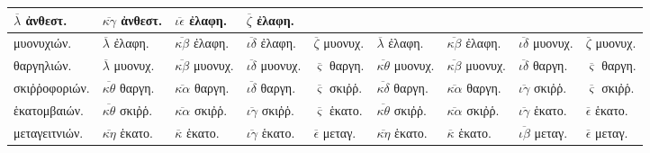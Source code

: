 \begin{tabular}{l llllllll}
$\overline{\lambda}$         \textgreek{ἀνθεστ.} &
$\overline{\kappa\gamma}$    \textgreek{ἀνθεστ.} &
$\overline{\iota\epsilon}$   \textgreek{ἐλαφη.} &
$\overline{\zeta}$           \textgreek{ἐλαφη.}
\\
\hline
\textgreek{μυονυχιών.} &
$\overline{\lambda}$         \textgreek{ἐλαφη.} &
$\overline{\kappa\beta}$     \textgreek{ἐλαφη.} &
$\overline{\iota\delta}$     \textgreek{ἐλαφη.} &
$\overline{\zeta}$           \textgreek{μυονυχ.} &
$\overline{\lambda}$         \textgreek{ἐλαφη.} &
$\overline{\kappa\beta}$     \textgreek{ἐλαφη.} &
$\overline{\iota\delta}$     \textgreek{μυονυχ.} &
$\overline{\zeta}$           \textgreek{μυονυχ.}
\\
\textgreek{θαργηλιών.} &
$\overline{\lambda}$         \textgreek{μυονυχ.} &
$\overline{\kappa\beta}$     \textgreek{μυονυχ.} &
$\overline{\iota\delta}$     \textgreek{μυονυχ.} &
$\overline{\varsigma}$       \textgreek{θαργη.} &
$\overline{\kappa\theta}$    \textgreek{μυονυχ.} &
$\overline{\kappa\beta}$     \textgreek{μυονυχ.} &
$\overline{\iota\delta}$     \textgreek{θαργη.} &
$\overline{\varsigma}$       \textgreek{θαργη.}
\\
\textgreek{σκιῤῥοφοριών.} &
$\overline{\kappa\theta}$    \textgreek{θαργη.} &
$\overline{\kappa\alpha}$    \textgreek{θαργη.} &
$\overline{\iota\delta}$     \textgreek{θαργη.} &
$\overline{\varsigma}$       \textgreek{σκιῤῥ.} &
$\overline{\kappa\delta}$    \textgreek{θαργη.} &
$\overline{\kappa\alpha}$    \textgreek{θαργη.} &
$\overline{\iota\gamma}$     \textgreek{σκιῤῥ.} &
$\overline{\varsigma}$       \textgreek{σκιῤῥ.}
\\
\hline
\textgreek{ἑκατομβαιών.} &
$\overline{\kappa\theta}$    \textgreek{σκιῤῥ.} &
$\overline{\kappa\alpha}$    \textgreek{σκιῤῥ.} &
$\overline{\iota\gamma}$     \textgreek{σκιῤῥ.} &
$\overline{\varsigma}$       \textgreek{ἑκατο.} &
$\overline{\kappa\theta}$    \textgreek{σκιῤῥ.} &
$\overline{\kappa\alpha}$    \textgreek{σκιῤῥ.} &
$\overline{\iota\gamma}$     \textgreek{ἑκατο.} &
$\overline{\epsilon}$        \textgreek{ἑκατο.}
\\
\textgreek{μεταγειτνιών.} &
$\overline{\kappa\eta}$      \textgreek{ἑκατο.} &
$\overline{\kappa}$          \textgreek{ἑκατο.} &
$\overline{\iota\gamma}$     \textgreek{ἑκατο.} &
$\overline{\epsilon}$        \textgreek{μεταγ.} &
$\overline{\kappa\eta}$      \textgreek{ἑκατο.} &
$\overline{\kappa}$          \textgreek{ἑκατο.} &
$\overline{\iota\beta}$      \textgreek{μεταγ.} &
$\overline{\epsilon}$        \textgreek{μεταγ.}

\end{tabular}
